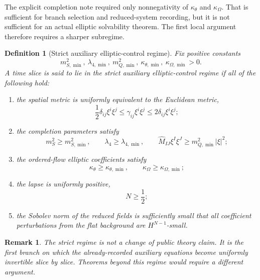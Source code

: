 \documentclass[11pt]{article}
\newtheorem{definition}{Definition}
\newtheorem{remark}{Remark}
\begin{document}
The explicit completion note required only nonnegativity of \(\kappa_\theta\) and \(\kappa_\Omega\). That is sufficient for branch selection and reduced-system recording, but it is not sufficient for an actual elliptic solvability theorem. The first local argument therefore requires a sharper subregime.

\begin{definition}[Strict auxiliary elliptic-control regime]
Fix positive constants
\begin{equation}
m_{S,\min}^2,\ \lambda_{4,\min},\ m_{Q,\min}^2,\ \kappa_{\theta,\min},\ \kappa_{\Omega,\min}>0.
\label{eq:lowerbounds}
\end{equation}
A time slice is said to lie in the \emph{strict auxiliary elliptic-control regime} if all of the following hold:
\begin{enumerate}
    \item the spatial metric is uniformly equivalent to the Euclidean metric,
    \begin{equation}
    \frac{1}{2}\delta_{ij}\xi^i\xi^j
    \le
    \gamma_{ij}\xi^i\xi^j
    \le
    2\delta_{ij}\xi^i\xi^j;
    \label{eq:metricequiv}
    \end{equation}
    \item the completion parameters satisfy
    \begin{equation}
    m_S^2\ge m_{S,\min}^2,
    \qquad
    \lambda_4\ge \lambda_{4,\min},
    \qquad
    \widehat M_{IJ}\xi^I\xi^J\ge m_{Q,\min}^2|\xi|^2;
    \label{eq:paramlower}
    \end{equation}
    \item the ordered-flow elliptic coefficients satisfy
    \begin{equation}
    \kappa_\theta\ge \kappa_{\theta,\min},
    \qquad
    \kappa_\Omega\ge \kappa_{\Omega,\min};
    \label{eq:auxlower}
    \end{equation}
    \item the lapse is uniformly positive,
    \begin{equation}
    N\ge \frac{1}{2};
    \label{eq:lapsepositive}
    \end{equation}
    \item the Sobolev norm of the reduced fields is sufficiently small that all coefficient perturbations from the flat background are \(H^{N-1}\)-small.
\end{enumerate}
\end{definition}

\begin{remark}
The strict regime is not a change of public theory claim. It is the first branch on which the already-recorded auxiliary equations become uniformly invertible slice by slice. Theorems beyond this regime would require a different argument.
\end{remark}
\end{document}
